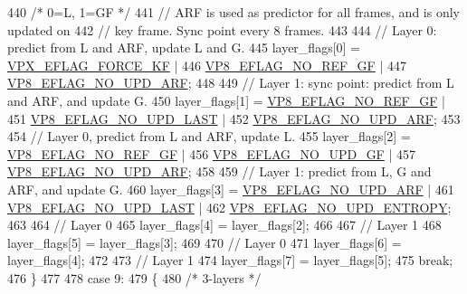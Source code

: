 \begin{DoxyCodeInclude}
{{{{{{{{{{{{{{{440         \textcolor{comment}{/* 0=L, 1=GF */}
441         \textcolor{comment}{// ARF is used as predictor for all frames, and is only updated on}
442         \textcolor{comment}{// key frame. Sync point every 8 frames.}
443 
444         \textcolor{comment}{// Layer 0: predict from L and ARF, update L and G.}
445         layer\_flags[0] = \hyperlink{group__encoder_ga4c4f4e3cbb5225d2c6c050e2d1e948fa}{VPX\_EFLAG\_FORCE\_KF}  |
446                          \hyperlink{group__vp8__encoder_gabb5e95343a2738abef44eca13059da33}{VP8\_EFLAG\_NO\_REF\_GF} |
447                          \hyperlink{group__vp8__encoder_ga1cff46a5287e73a620660030d40b9e6c}{VP8\_EFLAG\_NO\_UPD\_ARF};
448 
449         \textcolor{comment}{// Layer 1: sync point: predict from L and ARF, and update G.}
450         layer\_flags[1] = \hyperlink{group__vp8__encoder_gabb5e95343a2738abef44eca13059da33}{VP8\_EFLAG\_NO\_REF\_GF} |
451                          \hyperlink{group__vp8__encoder_ga602edb6b02a89cb2db7a16d6dffba583}{VP8\_EFLAG\_NO\_UPD\_LAST} |
452                          \hyperlink{group__vp8__encoder_ga1cff46a5287e73a620660030d40b9e6c}{VP8\_EFLAG\_NO\_UPD\_ARF};
453 
454         \textcolor{comment}{// Layer 0, predict from L and ARF, update L.}
455         layer\_flags[2] = \hyperlink{group__vp8__encoder_gabb5e95343a2738abef44eca13059da33}{VP8\_EFLAG\_NO\_REF\_GF}  |
456                          \hyperlink{group__vp8__encoder_gab01d066c5236457d345ce1cab4c41d6b}{VP8\_EFLAG\_NO\_UPD\_GF}  |
457                          \hyperlink{group__vp8__encoder_ga1cff46a5287e73a620660030d40b9e6c}{VP8\_EFLAG\_NO\_UPD\_ARF};
458 
459         \textcolor{comment}{// Layer 1: predict from L, G and ARF, and update G.}
460         layer\_flags[3] = \hyperlink{group__vp8__encoder_ga1cff46a5287e73a620660030d40b9e6c}{VP8\_EFLAG\_NO\_UPD\_ARF} |
461                          \hyperlink{group__vp8__encoder_ga602edb6b02a89cb2db7a16d6dffba583}{VP8\_EFLAG\_NO\_UPD\_LAST} |
462                          \hyperlink{group__vp8__encoder_ga5b91ad179910d4efc23aef66c7b2148b}{VP8\_EFLAG\_NO\_UPD\_ENTROPY};
463 
464         \textcolor{comment}{// Layer 0}
465         layer\_flags[4] = layer\_flags[2];
466 
467         \textcolor{comment}{// Layer 1}
468         layer\_flags[5] = layer\_flags[3];
469 
470         \textcolor{comment}{// Layer 0}
471         layer\_flags[6] = layer\_flags[4];
472 
473         \textcolor{comment}{// Layer 1}
474         layer\_flags[7] = layer\_flags[5];
475         \textcolor{keywordflow}{break};
476     \}
477 
478     \textcolor{keywordflow}{case} 9:
479     \{
480         \textcolor{comment}{/* 3-layers */}
}}}}}}}}}}}}}}}
\end{DoxyCodeInclude}
